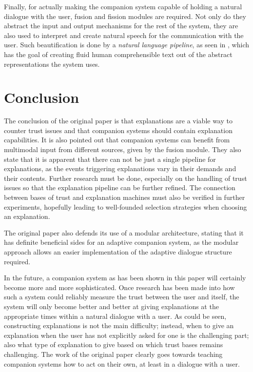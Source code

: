 \documentclass[a4paper]{article}
\begin{document}
Finally, for actually making the companion system capable of holding a natural dialogue with the user, fusion and fission modules are required. Not only do they abstract the input and output mechanisms for the rest of the system, they are also used to interpret and create natural speech for the communication with the user. Such beautification is done by a {\it natural language pipeline}, as seen in \cite{reiter2000building}, which has the goal of creating fluid human comprehensible text out of the abstract representations the system uses.

\section{Conclusion}

The conclusion of the original paper is that explanations are a viable way to counter trust issues and that companion systems should contain explanation capabilities. It is also pointed out that companion systems can benefit from multimodal input from different sources, given by the fusion module. They also state that it is apparent that there can not be just a single pipeline for explanations, as the events triggering explanations vary in their demands and their contents. Further research must be done, especially on the handling of trust issues so that the explanation pipeline can be further refined. The connection between bases of trust and explanation machines must also be verified in further experiments, hopefully leading to well-founded selection strategies when choosing an explanation.

The original paper also defends its use of a modular architecture, stating that it has definite beneficial sides for an adaptive companion system, as the modular approach allows an easier implementation of the adaptive dialogue structure required.

In the future, a companion system as has been shown in this paper will certainly become more and more sophisticated. Once research has been made into how such a system could reliably measure the trust between the user and itself, the system will only become better and better at giving explanations at the appropriate times within a natural dialogue with a user. As could be seen, constructing explanations is not the main difficulty; instead, when to give an explanation when the user has not explicitly asked for one is the challenging part; also what type of explanation to give based on which trust bases remains challenging. The work of the original paper clearly goes towards teaching companion systems how to act on their own, at least in a dialogue with a user.

\newpage

\end{document}

